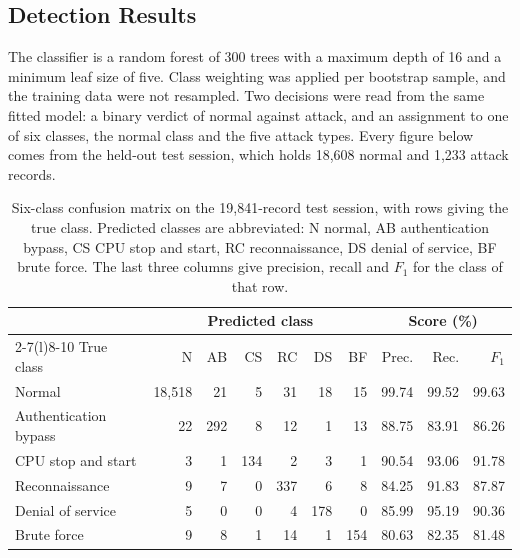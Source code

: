 \subsection{Detection Results}
\label{sec:anomaly:iuno-results}

The classifier is a random forest of 300 trees with a maximum depth of 16 and a minimum leaf
size of five. Class weighting was applied per bootstrap sample, and the training data were not
resampled. Two decisions were read from the same fitted model: a binary verdict of normal
against attack, and an assignment to one of six classes, the normal class and the five attack
types. Every figure below comes from the held-out test session, which holds 18,608 normal and
1,233 attack records.

\begin{table}[tbp]
  \centering
  \caption{Six-class confusion matrix on the 19,841-record test session, with rows giving the
  true class. Predicted classes are abbreviated: N normal, AB authentication bypass, CS CPU stop
  and start, RC reconnaissance, DS denial of service, BF brute force. The last three columns
  give precision, recall and $F_1$ for the class of that row.}
  \label{tab:anomaly:iuno-confusion}
  \small
  \setlength{\tabcolsep}{4.5pt}
  \begin{tabular}{@{}lrrrrrrrrr@{}}
    \toprule
    & \multicolumn{6}{c}{Predicted class} & \multicolumn{3}{c}{Score (\%)} \\
    \cmidrule(lr){2-7}\cmidrule(l){8-10}
    True class & N & AB & CS & RC & DS & BF & Prec. & Rec. & $F_1$ \\
    \midrule
    Normal                & 18,518 &  21 &   5 &  31 &  18 &  15 & 99.74 & 99.52 & 99.63 \\
    Authentication bypass &     22 & 292 &   8 &  12 &   1 &  13 & 88.75 & 83.91 & 86.26 \\
    CPU stop and start    &      3 &   1 & 134 &   2 &   3 &   1 & 90.54 & 93.06 & 91.78 \\
    Reconnaissance        &      9 &   7 &   0 & 337 &   6 &   8 & 84.25 & 91.83 & 87.87 \\
    Denial of service     &      5 &   0 &   0 &   4 & 178 &   0 & 85.99 & 95.19 & 90.36 \\
    Brute force           &      9 &   8 &   1 &  14 &   1 & 154 & 80.63 & 82.35 & 81.48 \\
    \bottomrule
  \end{tabular}
\end{table}

